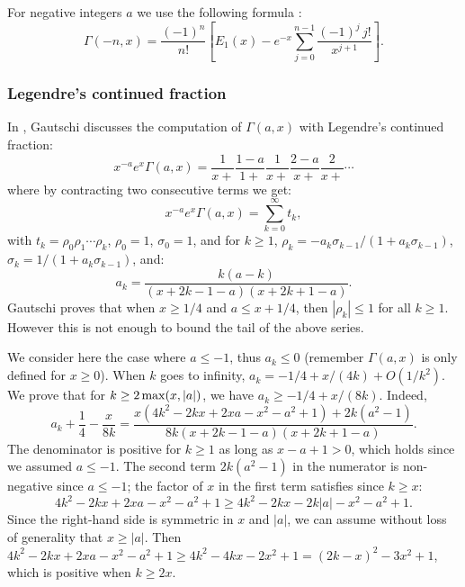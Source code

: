 \documentclass[12pt]{amsart}
\begin{document}
For negative integers $a$ we use the following formula
\cite[formula 6.5.19]{AbSt73}:
\[ \Gamma(-n,x) = \frac{(-1)^n}{n!} [E_1(x) - e^{-x}
   \sum_{j=0}^{n-1} \frac{(-1)^j \, j!}{x^{j+1}}]. \]

\subsubsection{Legendre's continued fraction}


In \cite{Gautschi79}, Gautschi discusses the computation of $\Gamma(a,x)$
with Legendre's continued fraction:
\[ x^{-a} e^x \Gamma(a,x) = \frac{1}{x+} \frac{1-a}{1+} \frac{1}{x+}
   \frac{2-a}{x+} \frac{2}{x+} \cdots \]
where by contracting two consecutive terms we get:
\begin{equation} \label{eq:legendre_cf}
x^{-a} e^x \Gamma(a,x) = \sum_{k=0}^{\infty} t_k,
\end{equation}
with $t_k = \rho_0 \rho_1 \cdots \rho_k$,
$\rho_0 = 1$, $\sigma_0 = 1$, and for $k \geq 1$,
$\rho_k = -a_k \sigma_{k-1} / (1 + a_k \sigma_{k-1})$,
$\sigma_k = 1 / (1 + a_k \sigma_{k-1})$, and:
\[ a_k = \frac{k (a-k)}{(x + 2k - 1 - a) (x + 2k + 1 - a)}. \]
Gautschi proves that when  $x \geq 1/4$ and $a \leq x + 1/4$, then
$|\rho_k| \leq 1$ for all $k \geq 1$. However this is not enough to bound
the tail of the above series.

We consider here the case where $a \leq -1$, thus $a_k \leq 0$
(remember $\Gamma(a,x)$ is only defined for $x \geq 0$).
When $k$ goes to infinity, $a_k = -1/4 + x/(4k) + O(1/k^2)$.
We prove that for $k \geq 2 \, {\rm max}(x,|a|)$, we have
$a_k \geq -1/4 + x/(8k)$. Indeed,
\[ a_k + \frac{1}{4} - \frac{x}{8k} = 
   \frac{x(4k^2-2kx+2xa-x^2-a^2+1)+2k(a^2-1)}{8k(x+2k-1-a)(x + 2 k + 1 - a)}. \]
The denominator is positive for $k \geq 1$ as long as $x-a+1 > 0$,
which holds since we assumed $a \leq -1$.
The second term $2k(a^2-1)$ in the numerator is non-negative since $a \leq -1$;
the factor of $x$ in the first term satisfies since $k \geq x$:
\[ 4k^2-2kx+2xa-x^2-a^2+1 \geq
   4k^2-2kx-2k|a|-x^2-a^2+1. \]
Since the right-hand side is symmetric in $x$ and $|a|$, we can assume
without loss of generality that $x \geq |a|$.
Then $4k^2-2kx+2xa-x^2-a^2+1 \geq 4k^2-4kx-2x^2+1
= (2k-x)^2 -3x^2 + 1$, which is positive when $k \geq 2x$.
\end{document}
